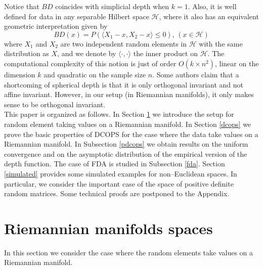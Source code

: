 \documentclass[a4paper]{article}
\numberwithin{equation}{section}
\begin{document}
Notice that $BD$ coincides with simplicial depth when $k=1$. Also, it is well defined for data in any separable Hilbert space $\mathcal H$, where it also has an equivalent  geometric interpretation given by
\begin{equation}\label{defpob}
BD(x)= P \left( \langle X_1-x, X_2-x \rangle \leq 0 \right),  \, \left(x \in \mathcal{H}\right)
\end{equation}
where $X_1$ and $X_2$ are two independent random elements in $\mathcal H$ with the same distribution as $X$, and we denote by  $\langle \cdot, \cdot \rangle$ the inner product on $\mathcal H$.
 The computational complexity of this notion is just of order $O(k \times n^2)$, linear on the dimension $k$ and quadratic on the sample size $n$. Some authors claim that a shortcoming of spherical depth is that it is only orthogonal invariant and not affine invariant. However, in our setup (in Riemannian manifolds), it only makes sense to be orthogonal invariant. 
 \\ 
This paper is organized as follows. In Section \ref{setup} we introduce the setup for random element taking values on a Riemannian manifold. In Section \ref{dcops} we prove the basic properties of DCOPS for the case where the data take values on a Riemannian manifold. In Subsection \ref{pdcops}  we  obtain results on the uniform convergence and on the asymptotic distribution of the empirical version of the depth function. The case of FDA is studied in Subsection \ref{fda}.  Section \ref{simulated} provides some simulated examples for  non--Euclidean spaces. In particular, we consider the important case of the space of positive definite  random matrices. Some technical proofs are postponed to the Appendix.


\section{Riemannian manifolds spaces}
\label{setup}
In this section we consider the case where the random elements take values on a Riemannian manifold. 
\end{document}

